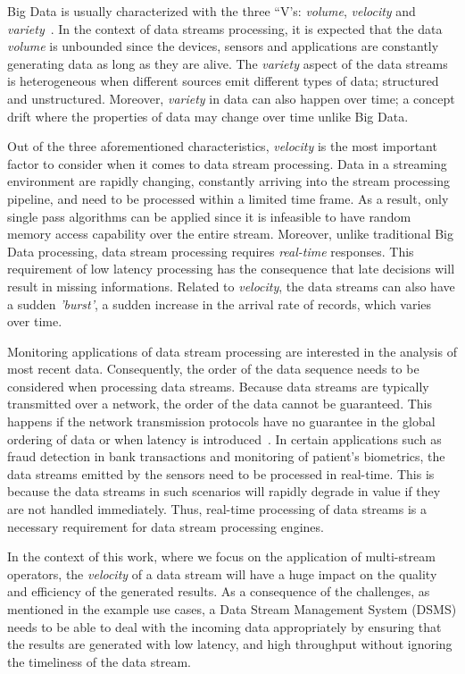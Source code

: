 Big Data is usually characterized with the three “V's: \emph{volume}, \emph{velocity} 
and \emph{variety}~\cite{big_data_analytics}.
In the context of data streams processing, it is expected that the data \emph{volume} 
is unbounded since the devices, sensors and applications are constantly 
generating data as long as they are alive. The \emph{variety} aspect of the 
data streams is heterogeneous when different sources 
emit different types of data; structured and unstructured. 
Moreover, \emph{variety} in data can also happen over time; a concept drift where 
the properties of data may change over time unlike Big Data. 


Out of the three aforementioned characteristics, \emph{velocity} is the most important 
factor to consider when it comes to data stream processing. Data in a streaming 
environment are rapidly changing, constantly arriving into the stream processing
pipeline, and need to be processed within a limited time frame.
As a result, only single pass algorithms can
be applied since it is infeasible to have random memory access capability
over the entire stream. Moreover, unlike traditional Big Data processing, 
data stream processing requires \emph{real-time} responses. 
This requirement of low latency processing has the consequence 
that late decisions will result in missing informations. Related to \emph{velocity}, 
the data streams can also have a sudden \emph{'burst'}, a sudden increase in the arrival rate of 
records, which varies over time. 

Monitoring applications of data stream processing are interested in the analysis of 
most recent data. Consequently, the order of the data sequence needs to be considered 
when processing data streams. 
Because data streams are typically transmitted over a 
network, the order of the data cannot be guaranteed. This happens if the network
transmission protocols have no guarantee in the global 
ordering of data or when latency is introduced~\cite{requirements_dsp}. 
In certain applications such as fraud detection in bank transactions and monitoring of 
patient's biometrics, the data streams emitted by the sensors need to be processed in 
real-time. This is because the data streams in such scenarios will rapidly degrade in 
value if they are not handled immediately. Thus, real-time processing of data streams 
is a necessary requirement for data stream processing engines. 

In the context of this work, where we focus on the application of multi-stream operators, 
the \emph{velocity} of a data stream will have a huge impact on the quality and efficiency of 
the generated results. As a consequence of the challenges, as mentioned in 
the example use cases, a Data Stream Management System (DSMS) needs 
to be able to deal with the incoming data appropriately by ensuring that the results are generated 
with low latency, and high throughput without ignoring the timeliness of the data stream.  

